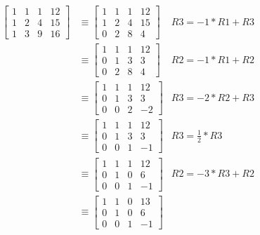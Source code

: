 \documentclass{../mathhomework}
\begin{document}
\begin{problem}[1.2\#33]
\begin{solution}
        \begin{align*}
            \begin{bmatrix}
                1 & 1 & 1 & 12 \\
                1 & 2 & 4 & 15 \\
                1 & 3 & 9 & 16
            \end{bmatrix}
            & \equiv
            \begin{bmatrix}
                1 & 1 & 1 & 12 \\
                1 & 2 & 4 & 15 \\
                0 & 2 & 8 & 4
            \end{bmatrix}
            & R3 = -1 * R1 + R3 \\ & \equiv
            \begin{bmatrix}
                1 & 1 & 1 & 12 \\
                0 & 1 & 3 & 3 \\
                0 & 2 & 8 & 4
            \end{bmatrix}
            & R2 = -1 * R1 + R2 \\ & \equiv
            \begin{bmatrix}
                1 & 1 & 1 & 12 \\
                0 & 1 & 3 & 3 \\
                0 & 0 & 2 & -2
            \end{bmatrix}
            & R3 = -2 * R2 + R3 \\ & \equiv
            \begin{bmatrix}
                1 & 1 & 1 & 12 \\
                0 & 1 & 3 & 3 \\
                0 & 0 & 1 & -1
            \end{bmatrix}
            & R3 = \frac{1}{2} * R3 \\ & \equiv
            \begin{bmatrix}
                1 & 1 & 1 & 12 \\
                0 & 1 & 0 & 6 \\
                0 & 0 & 1 & -1
            \end{bmatrix}
            & R2 = -3 * R3 + R2 \\ & \equiv
            \begin{bmatrix}
                1 & 1 & 0 & 13 \\
                0 & 1 & 0 & 6 \\
                0 & 0 & 1 & -1

\end{bmatrix}
\end{align*}
\end{solution}
\end{problem}
\end{document}

